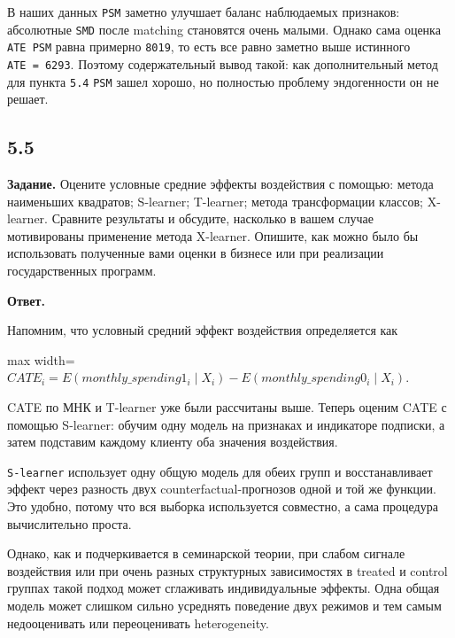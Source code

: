 \documentclass[11pt]{article}
\begin{document}
В наших данных \texttt{PSM} заметно улучшает баланс наблюдаемых
признаков: абсолютные \texttt{SMD} после matching становятся очень
малыми. Однако сама оценка \texttt{ATE\ PSM} равна примерно
\texttt{8019}, то есть все равно заметно выше истинного
\texttt{ATE\ =\ 6293}. Поэтому содержательный вывод такой: как
дополнительный метод для пункта \texttt{5.4} \texttt{PSM} зашел хорошо,
но полностью проблему эндогенности он не решает.

    \subsection{5.5}\label{section}

\textbf{Задание.} Оцените условные средние эффекты воздействия с
помощью: метода наименьших квадратов; S-learner; T-learner; метода
трансформации классов; X-learner. Сравните результаты и обсудите,
насколько в вашем случае мотивированы применение метода X-learner.
Опишите, как можно было бы использовать полученные вами оценки в бизнесе
или при реализации государственных программ.

\textbf{Ответ.}

Напомним, что условный средний эффект воздействия определяется как

\begin{center}
\begin{adjustbox}{max width=\linewidth}
\(\displaystyle CATE_i = E(monthly\_spending1_i \mid X_i) - E(monthly\_spending0_i \mid X_i).\)
\end{adjustbox}
\end{center}

CATE по МНК и T-learner уже были рассчитаны выше. Теперь оценим CATE с
помощью S-learner: обучим одну модель на признаках и индикаторе
подписки, а затем подставим каждому клиенту оба значения воздействия.

    \texttt{S-learner} использует одну общую модель для обеих групп и
восстанавливает эффект через разность двух counterfactual-прогнозов
одной и той же функции. Это удобно, потому что вся выборка используется
совместно, а сама процедура вычислительно проста.

Однако, как и подчеркивается в семинарской теории, при слабом сигнале
воздействия или при очень разных структурных зависимостях в treated и
control группах такой подход может сглаживать индивидуальные эффекты.
Одна общая модель может слишком сильно усреднять поведение двух режимов
и тем самым недооценивать или переоценивать heterogeneity.
\end{document}
